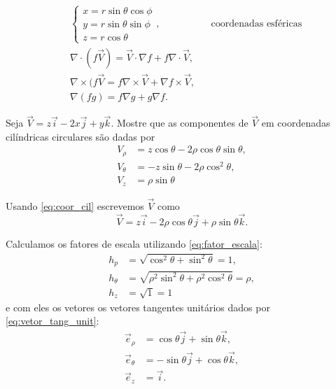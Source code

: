 \documentclass[a4paper,12pt, leqno, answers]{exam}
\begin{document}
\begin{align}
    \label{eq:coor_cil} \\
    & \begin{cases}
        x = r \sin \theta \cos \phi \\
        y = r \sin \theta \sin \phi \\
        z = r \cos \theta
    \end{cases}, && \text{coordenadas esf\'{e}ricas}
    \label{eq:coor_esf} \\
    & \nabla \cdot (f \vec{V}) = \vec{V} \cdot \nabla f + f \nabla \cdot \vec{V}, \\
    & \nabla \times (f \vec{V} = f \nabla \times \vec{V} + \nabla f \times \vec{V}, \\
    & \nabla(f g) = f \nabla g + g \nabla f.
\end{align}

\begin{questions}
    \question Seja $\vec{V} = z\vec{i} - 2x\vec{j} + y \vec{k}$. Mostre que as componentes de $\vec{V}$ em coordenadas cil\'{i}ndricas circulares s\~{a}o dadas por
    \begin{align*}
        V_\rho &= z \cos \theta - 2 \rho \cos \theta \sin \theta, \\
        V_\theta &= -z \sin \theta - 2 \rho \cos^2 \theta, \\
        V_z &= \rho \sin \theta
    \end{align*}
    \begin{solution}
        Usando \eqref{eq:coor_cil} escrevemos $\vec{V}$ como
        \[
        \vec{V} = z\vec{i} - 2 \rho \cos \theta \vec{j} + \rho \sin \theta \vec{k}.
        \]
  
        Calculamos os fatores de escala utilizando \eqref{eq:fator_escala}:
        \begin{align*}
            h_p &= \sqrt{\cos^2 \theta + \sin^2 \theta} = 1, \\
            h_\theta &= \sqrt{\rho^2 \sin^2 \theta + \rho^2 \cos^2 \theta} = \rho, \\
            h_z &= \sqrt{1} = 1
        \end{align*}
        e com eles os vetores os vetores tangentes unit\'{a}rios dados por \eqref{eq:vetor_tang_unit}:
        \begin{align*}
            \vec{e}_\rho &= \cos \theta \vec{j} + \sin \theta \vec{k}, \\
            \vec{e}_\theta &= - \sin \theta \vec{j} + \cos \theta \vec{k}, \\
            \vec{e}_z &= \vec{i}.
        \end{align*}
  

\end{solution}
\end{questions}
\end{document}
